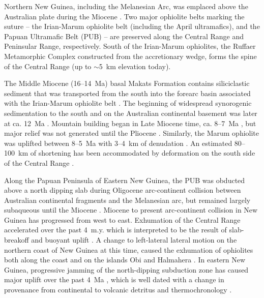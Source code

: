 \documentclass[11pt,letterpaper]{article}
\begin{document}
Northern New Guinea, including the Melanesian Arc, was emplaced above the Australian plate during the Miocene \citep{Hamilton1979a, Cloos2005a, vanUfford2005a, Baldwin2012a}. Two major ophiolite belts marking the suture -- the Irian-Marum ophiolite belt (including the April ultramafics), and the Papuan Ultramafic Belt (PUB) -- are preserved along the Central Range and Peninsular Range, respectively. South of the Irian-Marum ophiolites, the Ruffaer Metamorphic Complex constructed from the accretionary wedge, forms the spine of the Central Range (up to $\sim$5~km elevation today).

The Middle Miocene (16--14~Ma) basal Makats Formation contains siliciclastic sediment that was transported from the south into the forearc basin associated with the Irian-Marum ophiolite belt \citep{Visser1962a, Cloos2005a}. The beginning of widespread synorogenic sedimentation to the south and on the Australian continental basement was later at ca. 12~Ma \citep{vanUfford2005a}. Mountain building began in Late Miocene time, ca. 8--7~Ma \citep{vanUfford2005a, Baldwin2012a}, but major relief was not generated until the Pliocene \citep{Weiland1996a}. Similarly, the Marum ophiolite was uplifted between 8--5~Ma with 3--4~km of denudation \citep{Crowhurst1996a}. An estimated 80--100~km of shortening has been accommodated by deformation on the south side of the Central Range \citep{Hill1989a, Cloos2005a}.

Along the Papuan Peninsula of Eastern New Guinea, the PUB was obducted above a north dipping slab during Oligocene arc-continent collision between Australian continental fragments and the Melanesian arc, but remained largely subaqueous until the Miocene \citep{Davies1971a, Davies1984a, vanUfford2005a}. Miocene to present arc-continent collision in New Guinea has progressed from west to east. Exhumation of the Central Range accelerated over the past 4~m.y. which is interpreted to be the result of slab-breakoff and buoyant uplift \citep{Cloos2005a}. A change to left-lateral lateral motion on the northern coast of New Guinea at this time, caused the exhumation of ophiolites both along the coast \citep{Monnier1999a} and on the islands Obi \citep{Ali2001a} and Halmahera \citep{Hall1988a, Ballantyne1992a}. In eastern New Guinea, progressive jamming of the north-dipping subduction zone has caused major uplift over the past 4~Ma \citep{vanUfford2005a}, which is well dated with a change in provenance from continental to volcanic detritus \citep{Abbott1994a} and thermochronology \citep{Hill1989a}.
\end{document}
